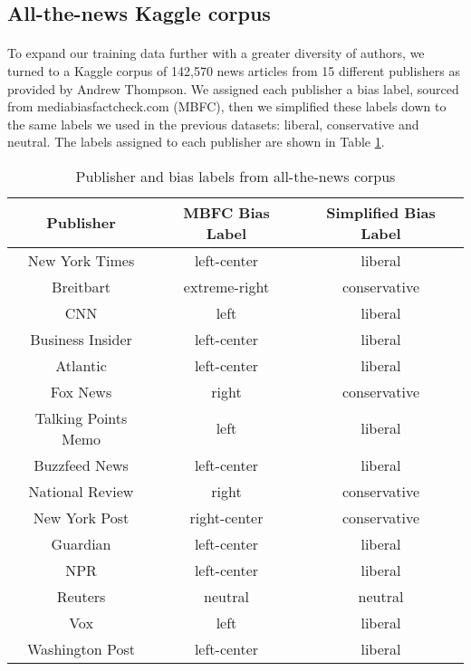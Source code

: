 \documentclass[10pt,a4paper,onecolumn]{article}
\begin{document}
\subsection{All-the-news Kaggle corpus}
\paragraph{}
To expand our training data further with a greater diversity of authors, we turned to a Kaggle corpus of 142,570 news articles from 15 different publishers as provided by Andrew Thompson\cite{news}. We assigned each publisher a bias label, sourced from mediabiasfactcheck.com (MBFC), then we simplified these labels down to the same labels we used in the previous datasets: liberal, conservative and neutral. The labels assigned to each publisher are shown in Table \ref{tab:pub-bias}. 

\begin{table}[h!]
	\begin{center}
		\caption{Publisher and bias labels from all-the-news corpus}
		\label{tab:pub-bias}
		\begin{tabular}{c|c|c}
			\hline\hline
			\textbf{Publisher} & \textbf{MBFC Bias Label} & \textbf{Simplified Bias Label} \\
			\hline
			New York Times & left-center & liberal \\
			Breitbart & extreme-right & conservative \\
			CNN & left & liberal \\
			Business Insider & left-center & liberal \\
			Atlantic & left-center & liberal \\
			Fox News & right & conservative \\
			Talking Points Memo & left & liberal \\
			Buzzfeed News & left-center & liberal \\
			National Review & right & conservative \\
			New York Post & right-center & conservative \\
			Guardian & left-center & liberal \\
			NPR & left-center & liberal \\
			Reuters & neutral & neutral \\
			Vox & left & liberal \\
			Washington Post & left-center & liberal \\
			\hline\hline
		\end{tabular}
	\end{center}
\end{table}
\end{document}
